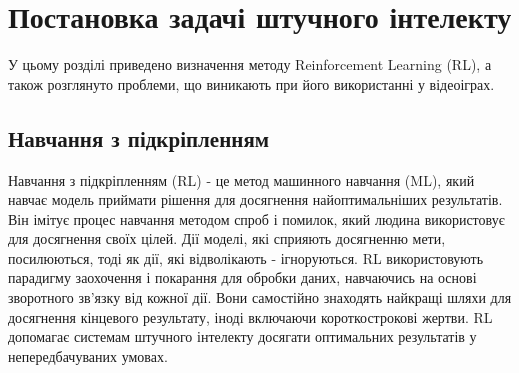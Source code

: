 

 \setcounter{chapter}{0}
 \chapter{Постановка задачі штучного інтелекту}

 
 \par У цьому розділі приведено визначення методу Reinforcement Learning (RL), 
 а також розглянуто проблеми, що виникають при його використанні у відеоіграх. 

 \section{Навчання з підкріпленням}
  \setcounter{equation}{0}
 \setcounter{theorem}{0}

 \par Навчання з підкріпленням (RL) - це метод машинного навчання (ML), 
 який навчає модель приймати рішення для досягнення найоптимальніших 
 результатів. Він імітує процес навчання методом спроб і помилок, який
  людина використовує для досягнення своїх цілей. Дії моделі,
  які сприяють досягненню мети, посилюються, тоді як дії,
  які відволікають - ігноруються.
  \newpage
  RL використовують парадигму заохочення і покарання для обробки даних,
  навчаючись на основі зворотного зв'язку від кожної дії. Вони самостійно знаходять найкращі 
  шляхи для досягнення кінцевого результату, іноді включаючи короткострокові жертви. RL допомагає
   системам штучного інтелекту досягати оптимальних результатів у непередбачуваних умовах.

